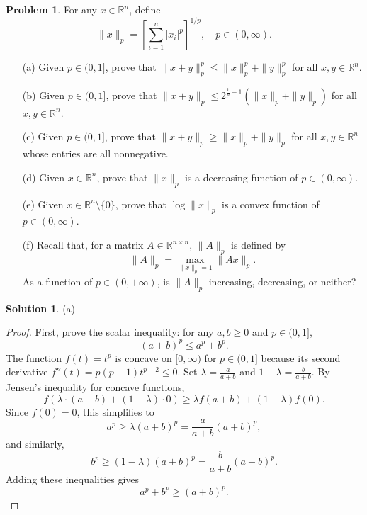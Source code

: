 \documentclass[12pt]{article}
\theoremstyle{definition}
\newtheorem*{solution}{\normalfont\textbf{Solution}}
\newtheorem*{Problem}{\noindent\textbf{Problem}}
\begin{document}
\begin{enumerate}[leftmargin=*]
    \item \begin{Problem}
            For any \( x \in \mathbb{R}^n \), define
            \[
            \|x\|_p = \left[ \sum_{i=1}^n |x_i|^p \right]^{1/p}, \quad p \in (0, \infty).
            \]
            \begin{enumerate}
                \item[(a)] Given \( p \in (0, 1] \), prove that \( \|x + y\|_p^p \leq \|x\|_p^p + \|y\|_p^p \) for all \( x, y \in \mathbb{R}^n \).
                \item[(b)] Given \( p \in (0, 1] \), prove that \( \|x + y\|_p \leq 2^{\frac{1}{p} - 1} (\|x\|_p + \|y\|_p) \) for all \( x, y \in \mathbb{R}^n \).
                \item[(c)] Given \( p \in (0, 1] \), prove that \( \|x + y\|_p \geq \|x\|_p + \|y\|_p \) for all \( x, y \in \mathbb{R}^n \) whose entries are all nonnegative.
                \item[(d)] Given \( x \in \mathbb{R}^n \), prove that \( \|x\|_p \) is a decreasing function of \( p \in (0, \infty) \).
                \item[(e)] Given \( x \in \mathbb{R}^n \setminus \{0\} \), prove that \( \log \|x\|_p \) is a convex function of \( p \in (0, \infty) \).
                \item[(f)] Recall that, for a matrix \( A \in \mathbb{R}^{n \times n} \), \( \|A\|_p \) is defined by
                \[
                \|A\|_p = \max_{\|x\|_p = 1} \|Ax\|_p.
                \]
                As a function of \( p \in (0, +\infty) \), is \( \|A\|_p \) increasing, decreasing, or neither?
            \end{enumerate}
        \end{Problem}
        \begin{solution}
            \item[(a)] 
                \begin{proof}
                    First, prove the scalar inequality: for any \( a, b \geq 0 \) and \( p \in (0,1] \),
                    \[
                    (a + b)^p \leq a^p + b^p.
                    \]
                    The function \( f(t) = t^p \) is concave on \([0, \infty)\) for \( p \in (0,1] \) because its second derivative \( f''(t) = p(p-1)t^{p-2} \leq 0 \). Set \( \lambda = \frac{a}{a + b} \) and \( 1 - \lambda = \frac{b}{a + b} \). By Jensen's inequality for concave functions,
                    \[
                    f(\lambda \cdot (a + b) + (1 - \lambda) \cdot 0) \geq \lambda f(a + b) + (1 - \lambda) f(0).
                    \]
                    Since \( f(0) = 0 \), this simplifies to
                    \[
                    a^p \geq \lambda (a + b)^p = \frac{a}{a + b} (a + b)^p,
                    \]
                    and similarly,
                    \[
                    b^p \geq (1 - \lambda) (a + b)^p = \frac{b}{a + b} (a + b)^p.
                    \]
                    Adding these inequalities gives
                    \[
                    a^p + b^p \geq (a + b)^p.
                    \]


\end{proof}
\end{solution}
\end{enumerate}
\end{document}
